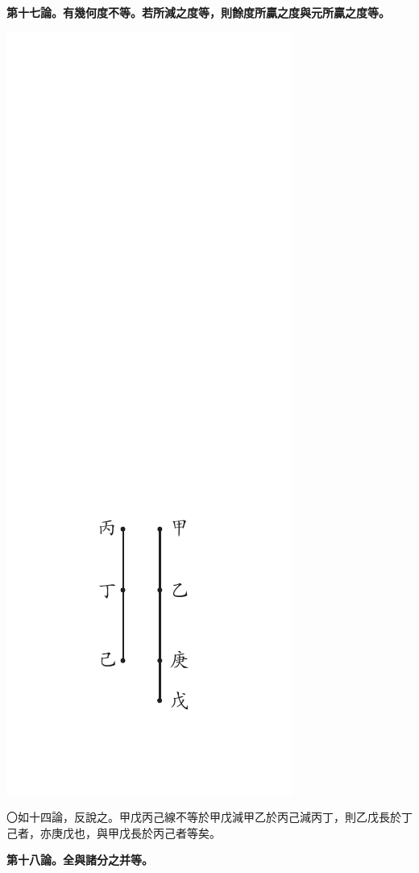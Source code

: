 \documentclass[12pt,b5paper,landscape]{article}
\newcommand{\bcom}[1]{〇#1}
\newcommand{\cthm}[1]{{
\vspace{8pt}

\bfseries #1}}
\begin{document}
\begin{multicols}{2}
\cthm{第十七論。有幾何度不等。若所減之度等，則餘度所贏之度與元所贏之度等。}
\begin{center}
\includegraphics[angle=90]{eu32}
\end{center}
\bcom{如十四論，反說之。甲戊丙己線不等於甲戊減甲乙於丙己減丙丁，則乙戊長於丁己者，亦庚戊也，與甲戊長於丙己者等矣。}

\cthm{第十八論。全與諸分之并等。}


\end{multicols}
\end{document}

